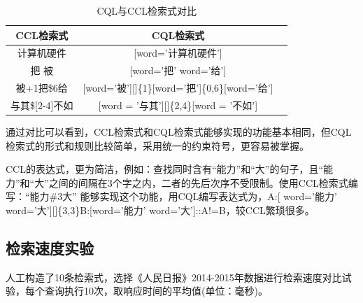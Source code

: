 \documentclass[11pt]{article}
\begin{document}
\begin{CJK*}{UTF8}{gbsn}
\begin{table}[h]
	\begin{center}
		\begin{tabular}{|c|c|c|}
			\hline \bf CCL检索式 & \bf CQL检索式 \\ \hline
			计算机硬件 & [word='计算机硬件'] \\
			把 \textbar 被 & [word='把'  word='给'] \\
			被+1把\$6给 & [word='被'][]\{1\}[word='把']\{0,6\}[word='给'] \\
			与其\$[2-4]不如 & [word = '与其'][]\{2,4\}[word = '不如'] \\
			
			\hline
		\end{tabular}
	\end{center}
	\caption{\label{font-table} CQL与CCL检索式对比}
\end{table}

通过对比可以看到，CCL检索式和CQL检索式能够实现的功能基本相同，但CQL检索式的形式和规则比较简单，采用统一的约束符号，更容易被掌握。

CCL的表达式，更为简洁，例如：查找同时含有“能力”和“大”的句子，且“能力”和“大”之间的间隔在3个字之内，二者的先后次序不受限制。使用CCL检索式编写：“能力\#3大” 能够实现这个功能，用CQL编写表达式为，A:[ word='能力' \textbar word='大'][]\{3,3\}B:[word='能力' \textbar word='大']::A!=B，较CCL繁琐很多。

\subsection{检索速度实验}

人工构造了10条检索式，选择《人民日报》2014-2015年数据进行检索速度对比试验，每个查询执行10次，取响应时间的平均值(单位：毫秒)。


\end{CJK*}
\end{document}
